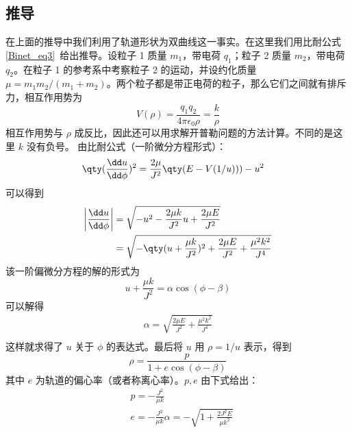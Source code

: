 \subsection{推导}
在上面的推导中我们利用了轨道形状为双曲线这一事实。在这里我们用比耐公式\autoref{Binet_eq3}~给出推导。设粒子 1 质量 $m_1$，带电荷 $q_1$；粒子 2 质量 $m_2$，带电荷 $q_2$。在粒子 1 的参考系中考察粒子 2 的运动，并设约化质量 $\mu=m_1m_2/(m_1+m_2)$。两个粒子都是带正电荷的粒子，那么它们之间就有排斥力，相互作用势为
\begin{equation}
V(\rho)=\frac{q_1q_2}{4\pi\epsilon_0\rho}=\frac{k}{\rho}
\end{equation}
相互作用势与 $\rho$ 成反比，因此还可以用求解开普勒问题的方法计算。不同的是这里 $k$ 没有负号。
由比耐公式（一阶微分方程形式）：
\begin{equation}
\begin{aligned}
&\qty(\frac{\dd u}{\dd \phi})^2=\frac{2\mu}{J^2}\qty(E-V(1/u)))-u^2
\end{aligned}
\end{equation}
可以得到
\begin{equation}
\begin{aligned}
\left|\frac{\dd u}{\dd \phi}\right|&=\sqrt{-u^2-\frac{2\mu k}{J^2}u+\frac{2\mu E}{J^2}}\\
&=\sqrt{-\qty(u+\frac{\mu k}{J^2})^2+\frac{2\mu E}{J^2}+\frac{\mu^2 k^2}{J^4}}
\end{aligned}
\end{equation}
该一阶偏微分方程的解的形式为
\begin{equation}
u+\frac{\mu k}{J^2}=\alpha\cos(\phi-\beta)
\end{equation}
可以解得
\begin{equation}
\begin{aligned}
\alpha=\sqrt{\frac{2\mu E}{J^2}+\frac{\mu^2 k^2}{J^4}}\\
\end{aligned}
\end{equation}
这样就求得了 $u$ 关于 $\phi$ 的表达式。最后将 $u$ 用 $\rho=1/u$ 表示，得到
\begin{equation}
\rho=\frac{p}{1+e\cos(\phi-\beta)}
\end{equation}
其中 $e$ 为轨道的偏心率（或者称离心率）。$p,e$ 由下式给出：
\begin{equation}
\begin{aligned}
&p=-\frac{J^2}{\mu k}\\
&e=-\frac{J^2}{\mu k}\alpha=-\sqrt{1+\frac{2J^2E}{\mu k^2}}
\end{aligned}
\end{equation}
